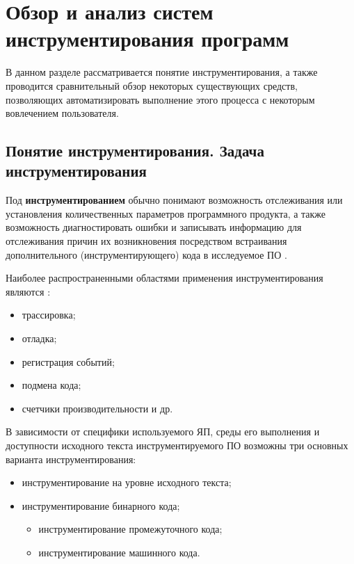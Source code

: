 \chapter{Обзор и анализ систем инструментирования программ}

В данном разделе рассматривается понятие инструментирования, а также проводится сравнительный обзор некоторых существующих средств, позволяющих автоматизировать выполнение этого процесса с некоторым вовлечением пользователя.

\section{Понятие инструментирования. Задача инструментирования}

Под \textbf{инструментированием} обычно понимают возможность отслеживания или установления количественных параметров программного продукта, а также возможность диагностировать ошибки и записывать информацию для отслеживания причин их возникновения посредством встраивания дополнительного (инструментирующего) кода в исследуемое ПО \cite{lomakina2016testirovanie}.

Наиболее распространенными областями применения инструментирования являются \cite{instrumentiruieto}:

\begin{itemize}
  \item трассировка;
  \item отладка;
  \item регистрация событий;
  \item подмена кода;
  \item счетчики производительности и др.
\end{itemize}

В зависимости от специфики используемого ЯП, среды его выполнения и доступности исходного текста инструментируемого ПО возможны три основных варианта инструментирования:

\begin{itemize}
  \item инструментирование на уровне исходного текста;
  \item инструментирование бинарного кода;
  \begin{itemize}
    \item инструментирование промежуточного кода;
    \item инструментирование машинного кода.
  \end{itemize}
\end{itemize}

